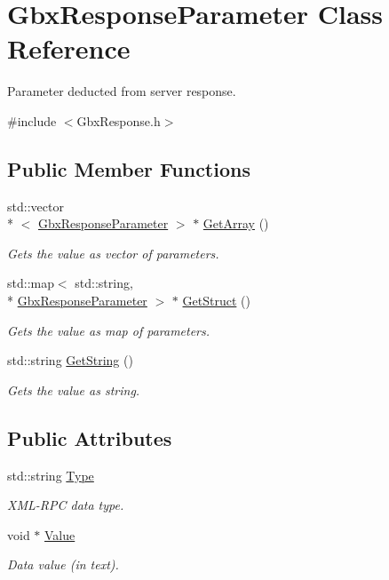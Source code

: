 \hypertarget{classGbxResponseParameter}{\section{Gbx\-Response\-Parameter Class Reference}
\label{classGbxResponseParameter}
}


Parameter deducted from server response.  




{\ttfamily \#include $<$Gbx\-Response.\-h$>$}

\subsection*{Public Member Functions}
\begin{DoxyCompactItemize}
\item 
std\-::vector\\*
$<$ \hyperlink{classGbxResponseParameter}{Gbx\-Response\-Parameter} $>$ $\ast$ \hyperlink{classGbxResponseParameter_a0cf214feb9ff46a353e999720ffea8d3}{Get\-Array} ()
\begin{DoxyCompactList}\small\item\em Gets the value as vector of parameters. \end{DoxyCompactList}\item 
std\-::map$<$ std\-::string, \\*
\hyperlink{classGbxResponseParameter}{Gbx\-Response\-Parameter} $>$ $\ast$ \hyperlink{classGbxResponseParameter_a11bee88d2b24ed96419b49ec78bbb8fc}{Get\-Struct} ()
\begin{DoxyCompactList}\small\item\em Gets the value as map of parameters. \end{DoxyCompactList}\item 
std\-::string \hyperlink{classGbxResponseParameter_a014af0f74e937d9002cda3e6e791735b}{Get\-String} ()
\begin{DoxyCompactList}\small\item\em Gets the value as string. \end{DoxyCompactList}\end{DoxyCompactItemize}
\subsection*{Public Attributes}
\begin{DoxyCompactItemize}
\item 
std\-::string \hyperlink{classGbxResponseParameter_aa1700ca65fa2526b112be24b5c0bdbf4}{Type}
\begin{DoxyCompactList}\small\item\em X\-M\-L-\/\-R\-P\-C data type. \end{DoxyCompactList}\item 
void $\ast$ \hyperlink{classGbxResponseParameter_afcbf7243976fef177ce4c6e8480a4ce3}{Value}
\begin{DoxyCompactList}\small\item\em Data value (in text). \end{DoxyCompactList}\end{DoxyCompactItemize}


